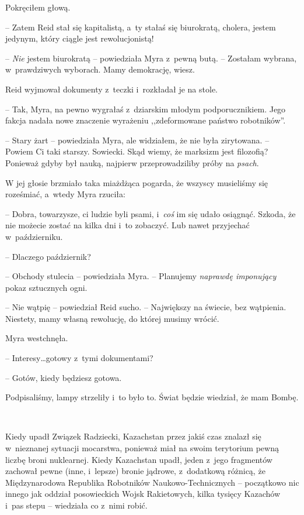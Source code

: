 \documentclass[oneside,polish,11pt,sfheadings]{mwbk}
\begin{document}
Pokręciłem głową. 

-- Zatem Reid stał się kapitalistą, a~ty stałaś się
biurokratą, cholera, jestem jedynym, który ciągle jest rewolucjonistą!

-- \emph{Nie} jestem biurokratą -- powiedziała Myra z~pewną butą. -- Zostałam wybrana, w~prawdziwych wyborach. Mamy demokrację, wiesz.

Reid wyjmował dokumenty z~teczki i~rozkładał je na stole. 

-- Tak, Myra,
na pewno wygrałaś z~dziarskim młodym podporucznikiem. Jego fakcja nadała
nowe znaczenie wyrażeniu ,,zdeformowane państwo robotników''.

-- Stary żart -- powiedziała Myra, ale widziałem, że nie była zirytowana.
-- Powiem Ci taki starszy. Sowiecki. Skąd wiemy, że marksizm jest
filozofią? Ponieważ gdyby był nauką, najpierw przeprowadziliby próby na
\emph{psach}.

W jej głosie brzmiało taka miażdżąca pogarda, że wszyscy musieliśmy się
roześmiać, a~wtedy Myra rzuciła: 

-- Dobra, towarzysze, ci ludzie byli
psami, i~\emph{coś} im się udało osiągnąć. Szkoda, że nie możecie zostać
na kilka dni i~to zobaczyć. Lub nawet przyjechać w~październiku.

-- Dlaczego październik?

-- Obchody stulecia -- powiedziała Myra. -- Planujemy \emph{naprawdę
imponujący} pokaz sztucznych ogni.

-- Nie wątpię -- powiedział Reid sucho. -- Największy na świecie, bez
wątpienia. Niestety, mamy własną rewolucję, do której musimy wrócić.

Myra westchnęła. 

-- Interesy\ldots gotowy z~tymi dokumentami?

-- Gotów, kiedy będziesz gotowa.

Podpisaliśmy, lampy strzeliły i~to było to. Świat będzie wiedział, że
mam Bombę.

~

Kiedy upadł Związek Radziecki, Kazachstan przez jakiś czas znalazł się w~nieznanej sytuacji mocarstwa, ponieważ miał na swoim terytorium pewną
liczbę broni nuklearnej. Kiedy Kazachstan upadł, jeden z~jego fragmentów
zachował pewne (inne, i~lepsze) bronie jądrowe, z~dodatkową różnicą, że
Międzynarodowa Republika Robotników Naukowo-Technicznych -- początkowo
nic innego jak oddział posowieckich Wojsk Rakietowych, kilka tysięcy
Kazachów i~pas stepu -- wiedziała co z~nimi robić.
\end{document}
